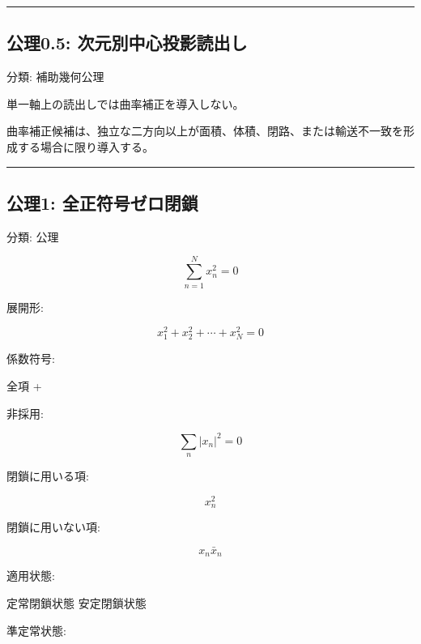 \documentclass[
  a4paper,
]{ltjsarticle}
\newenvironment{Shaded}{}{}
\newcommand{\NormalTok}[1]{#1}
\begin{document}
\begin{center}\rule{0.5\linewidth}{0.5pt}\end{center}

\subsection{公理0.5:
次元別中心投影読出し}\label{ux516cux74060.5-ux6b21ux5143ux5225ux4e2dux5fc3ux6295ux5f71ux8aadux51faux3057}

分類: 補助幾何公理

単一軸上の読出しでは曲率補正を導入しない。

曲率補正候補は、独立な二方向以上が面積、体積、閉路、または輸送不一致を形成する場合に限り導入する。

\begin{center}\rule{0.5\linewidth}{0.5pt}\end{center}

\subsection{公理1:
全正符号ゼロ閉鎖}\label{ux516cux74061-ux5168ux6b63ux7b26ux53f7ux30bcux30edux9589ux9396}

分類: 公理

\[
\sum_{n=1}^{N}x_n^2=0
\]

展開形:

\[
x_1^2+x_2^2+\cdots+x_N^2=0
\]

係数符号:

\begin{Shaded}
\begin{Highlighting}[]
\NormalTok{全項 +}
\end{Highlighting}
\end{Shaded}

非採用:

\[
\sum_n |x_n|^2=0
\]

閉鎖に用いる項:

\[
x_n^2
\]

閉鎖に用いない項:

\[
x_n\bar{x}_n
\]

適用状態:

\begin{Shaded}
\begin{Highlighting}[]
\NormalTok{定常閉鎖状態}
\NormalTok{安定閉鎖状態}
\end{Highlighting}
\end{Shaded}

準定常状態:
\end{document}
